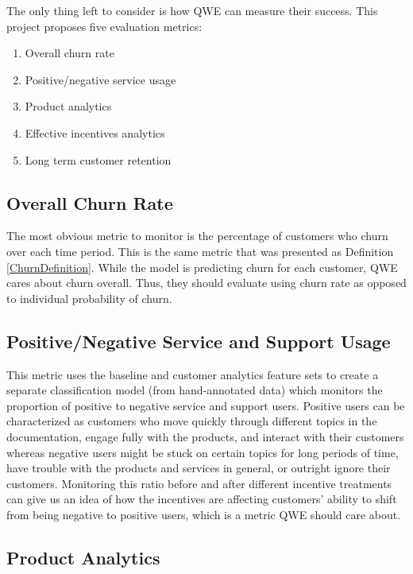 \documentclass{article}
\begin{document}
	The only thing left to consider is how QWE can measure their success. This project proposes five evaluation metrics:
	\begin{enumerate}
		\item Overall churn rate
		\item Positive/negative service usage
		\item Product analytics
		\item Effective incentives analytics
		\item Long term customer retention
	\end{enumerate}

	\subsection{Overall Churn Rate}
	
	The most obvious metric to monitor is the percentage of customers who churn over each time period. This is the same metric that was presented as Definition \ref{ChurnDefinition}. While the model is predicting churn for each customer, QWE cares about churn overall. Thus, they should evaluate using churn rate as opposed to individual probability of churn.
	
	\subsection{Positive/Negative Service and Support Usage}
	
	This metric uses the baseline and customer analytics feature sets to create a separate classification model (from hand-annotated data) which monitors the proportion of positive to negative service and support users. Positive users can be characterized as customers who move quickly through different topics in the documentation, engage fully with the products, and interact with their customers whereas negative users might be stuck on certain topics for long periods of time, have trouble with the products and services in general, or outright ignore their customers. Monitoring this ratio before and after different incentive treatments can give us an idea of how the incentives are affecting customers' ability to shift from being negative to positive users, which is a metric QWE should care about. 
	
	\subsection{Product Analytics}
	
\end{document}
